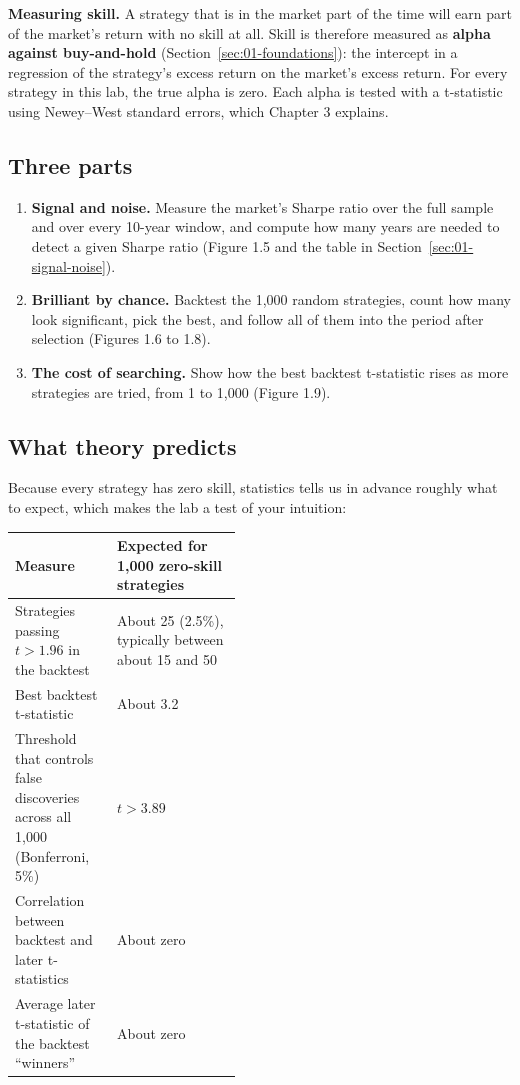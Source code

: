 \textbf{Measuring skill.} A strategy that is in the market part of the time will earn part of the market's return with no skill at all. Skill is therefore measured as \textbf{alpha against buy-and-hold} (Section~\ref{sec:01-foundations}): the intercept in a regression of the strategy's excess return on the market's excess return. For every strategy in this lab, the true alpha is zero. Each alpha is tested with a t-statistic using Newey--West standard errors, which Chapter 3 explains.

\subsection*{Three parts}

\begin{enumerate}
  \item \textbf{Signal and noise.} Measure the market's Sharpe ratio over the full sample and over every 10-year window, and compute how many years are needed to detect a given Sharpe ratio (Figure 1.5 and the table in Section~\ref{sec:01-signal-noise}).
  \item \textbf{Brilliant by chance.} Backtest the 1,000 random strategies, count how many look significant, pick the best, and follow all of them into the period after selection (Figures 1.6 to 1.8).
  \item \textbf{The cost of searching.} Show how the best backtest t-statistic rises as more strategies are tried, from 1 to 1,000 (Figure 1.9).
\end{enumerate}

\subsection*{What theory predicts}

Because every strategy has zero skill, statistics tells us in advance roughly what to expect, which makes the lab a test of your intuition:

\begin{center}
\small
\begin{tabularx}{0.9\linewidth}{@{}>{\raggedright\arraybackslash}p{0.450\linewidth}>{\raggedright\arraybackslash}X@{}}
\toprule
Measure & Expected for 1,000 zero-skill strategies \\
\midrule
Strategies passing $t > 1.96$ in the backtest & About 25 (2.5\%), typically between about 15 and 50 \\
Best backtest t-statistic & About 3.2 \\
Threshold that controls false discoveries across all 1,000 (Bonferroni, 5\%) & $t > 3.89$ \\
Correlation between backtest and later t-statistics & About zero \\
Average later t-statistic of the backtest ``winners'' & About zero \\
\bottomrule
\end{tabularx}
\end{center}

